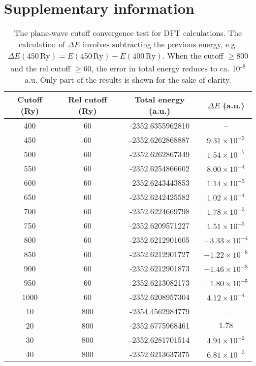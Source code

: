 \chapter{Supplementary information}

\begin{table}[htbp]
    \centering
    \caption{The plane-wave cutoff convergence test for DFT calculations. The calculation of $\Delta E$ involves subtracting the previous energy, e.g. $\Delta E(450\,\mathrm{Ry}) = E(450\,\mathrm{Ry}) - E(400\,\mathrm{Ry})$. When the cutoff $\ge 800$ and the rel cutoff $\ge 60$, the error in total energy reduces to ca. 10\textsuperscript{-8} a.u. Only part of the results is shown for the sake of clarity.}
    \label{tab:cutoff-convergence-test}
    \begin{tabular}{cccc}
    \toprule
    \textbf{Cutoff (Ry)} & \textbf{Rel cutoff (Ry)} & \textbf{Total energy (a.u.)} & \textbf{\boldmath$\Delta E$ (a.u.)} \\
    \midrule
    400 & 60 & -2352.6355962810 & -- \\
    450 & 60 &  -2352.6262868887 & $9.31 \times 10^{-3}$ \\
    500 & 60 &  -2352.6262867349 & $1.54 \times 10^{-7}$ \\
    550 & 60 &  -2352.6254866602 & $8.00 \times 10^{-4}$ \\
    600 & 60 &  -2352.6243443853 & $1.14 \times 10^{-3}$ \\
    650 & 60 &  -2352.6242425582 & $1.02 \times 10^{-4}$ \\
    700 & 60 &  -2352.6224669798 & $1.78 \times 10^{-3}$ \\
    750 & 60 &  -2352.6209571227 & $1.51 \times 10^{-3}$ \\
    800 & 60 &  -2352.6212901605 & $-3.33 \times 10^{-4}$ \\
    850 & 60 &  -2352.6212901727 & $-1.22 \times 10^{-8}$ \\
    900 & 60 &  -2352.6212901873 & $-1.46 \times 10^{-8}$ \\
    950 & 60 &  -2352.6213082173 & $-1.80 \times 10^{-5}$ \\
    1000 & 60 &  -2352.6208957304 & $4.12 \times 10^{-4}$ \\
    \midrule
    10 & 800 & -2354.4562984779 & -- \\
    20 & 800 &  -2352.6775968461 & $1.78$ \\
    30 & 800 &  -2352.6281701514 & $4.94 \times 10^{-2}$ \\
    40 & 800 &  -2352.6213637375 & $6.81 \times 10^{-3}$ \\

\end{tabular}
\end{table}
